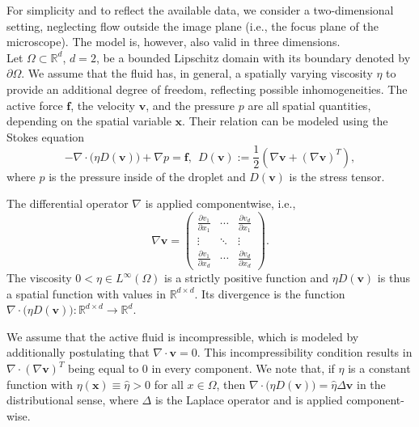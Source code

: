 \documentclass[final,leqno]{scrarticle}
\newcommand{\RR}{\mathbb{R}}
\begin{document}
For simplicity and to reflect the available data, we consider a two-dimensional setting, neglecting flow outside the image plane (i.e., the focus plane of the microscope). The model is, however, also valid in three dimensions.\\
Let $\Omega \subset \RR^d$, $d=2$, be a bounded Lipschitz domain with its boundary denoted by $\partial\Omega$. 
We assume that the fluid has, in general, a spatially varying viscosity $\eta$ to provide an additional degree of freedom, reflecting possible inhomogeneities. The active force $\mathbf{f}$, the velocity $\mathbf{v}$, and the pressure $p$ are all spatial quantities, depending on the spatial variable $\mathbf{x}$.   
Their relation can be modeled using the Stokes equation
\begin{equation} \label{eq:stokes_basic}
  - \nabla \cdot \big( \eta D(\mathbf{v}) \big) + \nabla p =  \mathbf{f}, \ \  D(\mathbf{v}):= \frac{1}{2} \left( \nabla \mathbf{v} + (\nabla \mathbf{v})^T \right),
\end{equation}
where $p$ is the pressure inside of the droplet and $D(\mathbf{v})$ is the stress tensor. 

\vspace{1ex}

The differential operator $\nabla$ is applied componentwise, i.e.,
\begin{displaymath}
 \nabla \mathbf{v} = \begin{pmatrix}
             \frac{\partial v_1}{\partial x_1} & \cdots & \frac{\partial v_d}{\partial x_1} \\
             \vdots & \ddots & \vdots \\
             \frac{\partial v_1}{\partial x_d} & \cdots & \frac{\partial v_d}{\partial x_d} 
            \end{pmatrix}.
\end{displaymath}
The viscosity $0<\eta \in L^{\infty}(\Omega)$ is a strictly positive function and $\eta D(\mathbf{v})$ is thus a spatial function with values in $\RR^{d \times d}$. Its divergence is the function $\nabla \cdot \big( \eta D(\mathbf{v}) \big) : \RR^{d\times d} \to \RR^d$.  %

\vspace{1ex}

We assume that the active fluid is incompressible, which is modeled by additionally postulating that $ \nabla \cdot \mathbf{v} = 0$.
This incompressibility condition results in $ \nabla \cdot (\nabla \mathbf{v})^T $ being equal to $0$ in every component. 
We note that, if $\eta$ is a constant function with $\eta(\mathbf{x}) \equiv \hat{\eta} > 0$ for all $x \in \Omega$, then $\nabla \cdot \big( \eta D(\mathbf{v}) \big) = \hat{\eta} \Delta \mathbf{v}$ in the distributional sense, where $\Delta$ is the Laplace operator and is applied component-wise.
\end{document}
